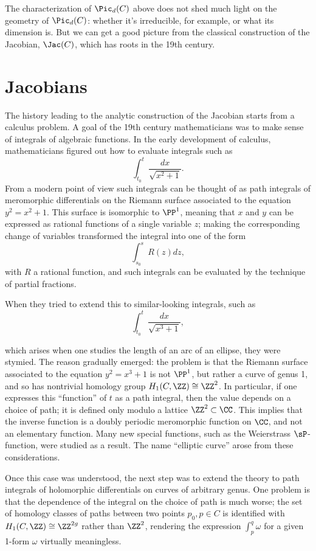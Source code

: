 The characterization of $\Pic_d(C)$ above does not shed much light on the geometry of $\Pic_d(C)$: whether it's irreducible, for example, or what its dimension is. But we can get a  good picture from the classical construction of the Jacobian, $\Jac(C)$, which has roots in the 19th century.
 
\section{Jacobians}

The history leading to the analytic construction of the Jacobian starts from a calculus problem. A goal of the 19th century mathematicians was  to make sense of integrals of algebraic functions. In the early development of calculus, mathematicians figured out how to evaluate  integrals such as
$$
\int_{t_0}^t \frac{dx}{\sqrt{x^2+1}}.
$$
From a modern point of view such integrals can be thought of as path integrals of meromorphic differentials on the Riemann surface associated to the equation $y^2 = x^2+1$. This surface is isomorphic to $\PP^1$, meaning that $x$ and $y$ can be expressed as rational functions of a single variable $z$; making the corresponding change of variables transformed the integral into one of the form
$$
\int_{s_0}^s R(z)dz,
$$
with $R$ a rational function, and such integrals can be evaluated by the technique of partial fractions.

When they tried to extend this to similar-looking integrals, such as
$$
\int_{t_0}^t \frac{dx}{\sqrt{x^3+1}},
$$




which arises when one studies the length of an arc of an ellipse, they were stymied. The reason gradually emerged: the problem is that the Riemann surface associated to the equation $y^2 = x^3+1$ is not $\PP^1$, but rather a curve of genus 1, and so has nontrivial homology group $H_1(C, \ZZ) \cong \ZZ^2$. In particular, if one expresses this ``function'' of $t$  as a path integral, then the value depends on a choice of path; it is defined only modulo a lattice $\ZZ^2 \subset \CC$. This implies that the inverse function is a doubly periodic meromorphic function on $\CC$, and not an elementary function. Many new special functions, such as the Weierstrass $\sP$-function, were studied as a result. The name ``elliptic curve'' arose from these considerations.

Once this case was understood, the next step was to extend the theory to path integrals of holomorphic differentials on curves of arbitrary genus. One problem is that the dependence of the integral on the choice of path is much worse; the set of homology classes of paths between two points $p_0, p \in C$ is identified with $H_1(C,\ZZ) \cong \ZZ^{2g}$ rather than $\ZZ^2$, rendering the expression $\int_p^q \omega$ for a given 1-form $\omega$ virtually meaningless.

